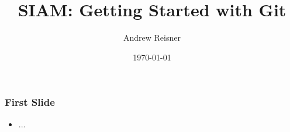 \documentclass{beamer}
\title{SIAM: Getting Started with Git}
\author{Andrew Reisner}
\date{\today}
\begin{document}
\frame{\titlepage}

\frame
{
  \frametitle{First Slide}

  \begin{itemize}
  \item ...
  \end{itemize}
}
\end{document}
